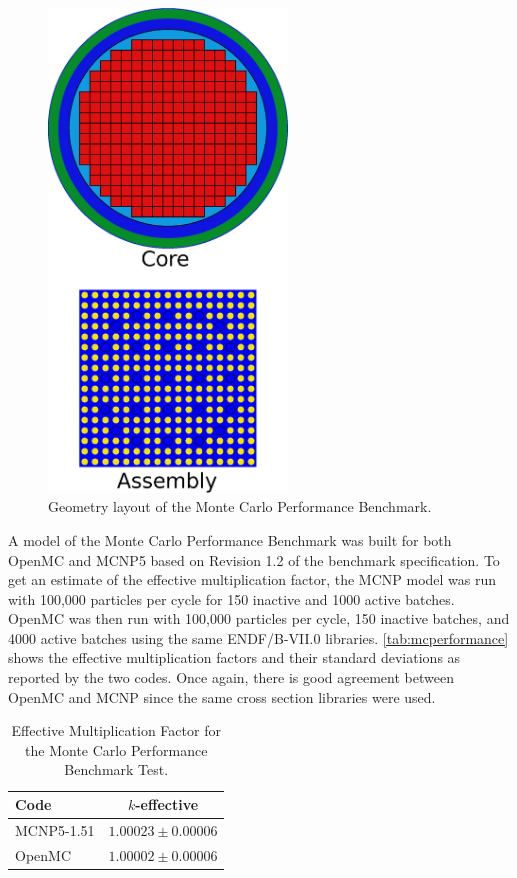 \documentclass[authoryear,preprint]{elsarticle}
\begin{document}
\begin{figure}[!ht]
  \centering
  \includegraphics[width=2.5in]{mcperformance.eps}
  \caption{Geometry layout of the Monte Carlo Performance Benchmark.}
  \label{fig:core}
\end{figure}

A model of the Monte Carlo Performance Benchmark was built for both OpenMC and
MCNP5 based on Revision 1.2 of the benchmark specification. To get an estimate
of the effective multiplication factor, the MCNP model was run with 100,000
particles per cycle for 150 inactive and 1000 active batches. OpenMC was then
run with 100,000 particles per cycle, 150 inactive batches, and 4000 active
batches using the same ENDF/B-VII.0 libraries. \autoref{tab:mcperformance} shows
the effective multiplication factors and their standard deviations as reported
by the two codes. Once again, there is good agreement between OpenMC and MCNP
since the same cross section libraries were used.

\begin{table}
  \caption{Effective Multiplication Factor for the Monte Carlo Performance
    Benchmark Test.}
  \label{tab:mcperformance}
  \begin{center}
  \begin{tabular}{ l c }
    \hline
    Code & $k$-effective \\
    \hline
    MCNP5-1.51 & $1.00023 \pm 0.00006$ \\
    OpenMC     & $1.00002 \pm 0.00006$ \\
    \hline
  \end{tabular}
  \end{center}
\end{table}
\end{document}

